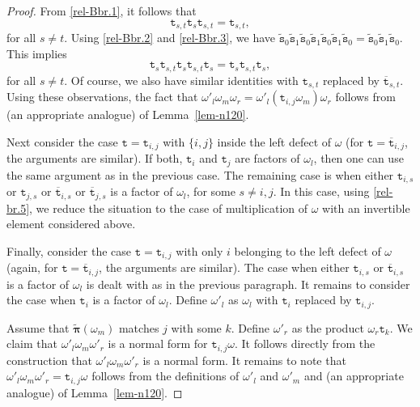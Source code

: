\documentclass[a4paper]{amsart}
\begin{document}
\begin{proof}
From \eqref{rel-Bbr.1}, it follows that
\begin{equation}\label{eqn5-1-1}
\mathtt{t}_{s,t}\mathtt{t}_{s}\mathtt{t}_{s,t}=\mathtt{t}_{s,t},
\end{equation}
for all $s\neq t$. Using \eqref{rel-Bbr.2} and \eqref{rel-Bbr.3}, we have
$\tilde{\mathtt{s}}_0\tilde{\mathtt{s}}_1\tilde{\mathtt{s}}_0\tilde{\mathtt{s}}_1
\tilde{\mathtt{s}}_0\tilde{\mathtt{s}}_1\tilde{\mathtt{s}}_0
=\tilde{\mathtt{s}}_0\tilde{\mathtt{s}}_1\tilde{\mathtt{s}}_0$.
This implies
\begin{equation}\label{eqn5-1-1-2}
\mathtt{t}_{s}\mathtt{t}_{s,t}\mathtt{t}_{s}\mathtt{t}_{s,t}\mathtt{t}_{s}=
\mathtt{t}_{s}\mathtt{t}_{s,t}\mathtt{t}_{s},
\end{equation}
for all $s\neq t$. Of course, we also have similar  identities with
$\mathtt{t}_{s,t}$ replaced by $\overline{\mathtt{t}}_{s,t}$.
Using these observations, the fact that $\omega'_l\omega_m\omega_r=
\omega'_l(\mathtt{t}_{i,j}\omega_m)\omega_r$ follows from (an appropriate
analogue) of Lemma~\ref{lem-n120}.

Next consider the case $\mathtt{t}=\mathtt{t}_{i,j}$ 
with $\{i,j\}$ inside the left defect of $\omega$
(for $\mathtt{t}=\overline{\mathtt{t}}_{i,j}$, the arguments are similar).
If both, $\mathtt{t}_i$ and $\mathtt{t}_j$ are factors of 
$\omega_l$, then one can use the same argument as in the previous case.
The remaining case is when either $\mathtt{t}_{i,s}$ or
$\mathtt{t}_{j,s}$ or $\overline{\mathtt{t}}_{i,s}$
or $\overline{\mathtt{t}}_{j,s}$ is a factor of $\omega_l$,
for some $s\neq i,j$.
In this case, using \eqref{rel-br.5}, we reduce the situation to the
case of multiplication of $\omega$ with an invertible element considered above.

Finally, consider the case $\mathtt{t}=\mathtt{t}_{i,j}$ 
with only $i$ belonging to the left defect of $\omega$
(again, for $\mathtt{t}=\overline{\mathtt{t}}_{i,j}$, the arguments are similar).
The case when either $\mathtt{t}_{i,s}$ or $\overline{\mathtt{t}}_{i,s}$
is a factor of $\omega_l$ is dealt with as in the previous paragraph.
It remains to consider the case when $\mathtt{t}_i$ is a factor of
$\omega_l$. Define $\omega'_l$ as $\omega_l$ with $\mathtt{t}_i$
replaced by $\mathtt{t}_{i,j}$.

Assume that $\tilde{\boldsymbol{\pi}}(\omega_m)$ matches
$j$ with some $k$. Define $\omega'_r$ as the product 
$\omega_r\mathtt{t}_k$. We claim that $\omega'_l\omega_m\omega'_r$
is a normal form for $\mathtt{t}_{i,j}\omega$. It follows directly from
the construction that $\omega'_l\omega_m\omega'_r$
is a normal form. It remains to note that 
$\omega'_l\omega_m\omega'_r=\mathtt{t}_{i,j}\omega$
follows from the definitions of $\omega'_l$ and $\omega'_m$
and (an appropriate analogue) of Lemma~\ref{lem-n120}.
\end{proof}
\end{document}
